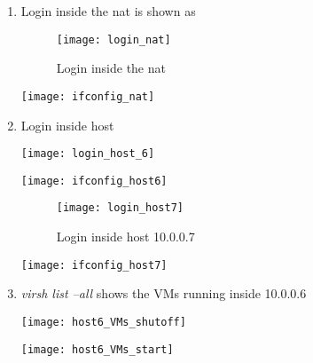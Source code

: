 \begin{enumerate}
\newpage
\item Login inside the nat is shown as

\begin{figure}[h]
\caption{Login inside the nat}
\centering
\texttt{[image: login\_nat]}
\end{figure}


\begin{minipage}{\linewidth}
\centering
\texttt{[image: ifconfig\_nat]}
\end{minipage}

\item Login inside host

\begin{minipage}{\linewidth}
\centering
\texttt{[image: login\_host\_6]}
\end{minipage}


\begin{minipage}{\linewidth}

\centering
\texttt{[image: ifconfig\_host6]}
\end{minipage}

\begin{figure}[h]
\caption{Login inside host 10.0.0.7}
\centering
\texttt{[image: login\_host7]}
\end{figure}


\begin{minipage}{\linewidth}

\centering
\texttt{[image: ifconfig\_host7]}
\end{minipage}

\item \textit{virsh list --all} shows the VMs running inside 10.0.0.6

\begin{minipage}{\linewidth}
\centering
\texttt{[image: host6\_VMs\_shutoff]}
\end{minipage}

\begin{minipage}{\linewidth}
\centering
\texttt{[image: host6\_VMs\_start]}
\end{minipage}


\end{enumerate}
